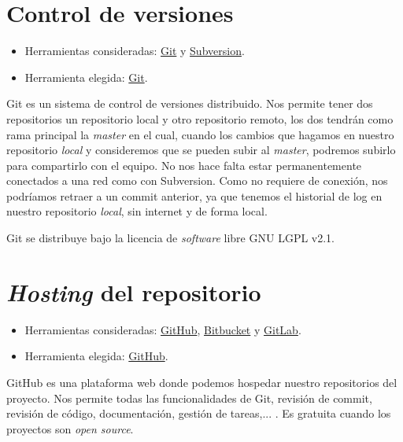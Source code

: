 
\section{Control de versiones}\label{control-de-versiones}

\begin{itemize}
	\tightlist
	\item
	Herramientas consideradas: \href{https://git-scm.com/}{Git} y
	\href{https://subversion.apache.org/}{Subversion}.
	\item
	Herramienta elegida: \href{https://git-scm.com/}{Git}.
\end{itemize}

Git es un sistema de control de versiones distribuido. Nos permite tener dos repositorios un repositorio local y otro repositorio remoto, los dos tendrán como rama principal la \emph{master} en el cual, cuando los cambios que hagamos en nuestro repositorio \emph{local} y consideremos que se pueden subir al \emph{master}, podremos subirlo para compartirlo con el equipo. No nos hace falta estar permanentemente conectados a una red como con Subversion. Como no requiere de conexión, nos podríamos retraer a un commit anterior, ya que tenemos el historial de log en nuestro repositorio \emph{local}, sin internet y de forma local.\cite{web:git}

Git se distribuye bajo la licencia de \emph{software} libre GNU LGPL v2.1.

\section{\emph{Hosting} del repositorio}\label{hosting-del-repositorio}

\begin{itemize}
	\tightlist
	\item
	Herramientas consideradas: \href{https://github.com/}{GitHub},
	\href{https://bitbucket.org/}{Bitbucket} y
	\href{https://gitlab.com/}{GitLab}.
	\item
	Herramienta elegida: \href{https://github.com/}{GitHub}.
\end{itemize}

GitHub es una plataforma web donde podemos hospedar nuestro repositorios del proyecto.
Nos permite todas las  funcionalidades de Git, revisión de commit, revisión de código,
documentación, gestión de tareas,... . Es
gratuita cuando los proyectos son \emph{open source}.

